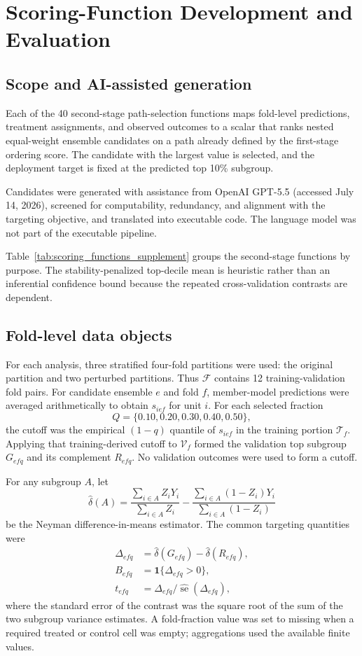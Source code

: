 \documentclass[12pt]{article}
\newcommand{\TargetFrac}{10{\%}\xspace}
\begin{document}
\section{Scoring-Function Development and Evaluation}
\label{supp:development_provenance}

\subsection{Scope and AI-assisted generation}

Each of the 40 second-stage path-selection functions maps fold-level predictions, treatment assignments, and observed outcomes to a scalar that ranks nested equal-weight ensemble candidates on a path already defined by the first-stage ordering score. The candidate with the largest value is selected, and the deployment target is fixed at the predicted top \TargetFrac{} subgroup.

Candidates were generated with assistance from OpenAI GPT-5.5 (accessed July 14, 2026), screened for computability, redundancy, and alignment with the targeting objective, and translated into executable code. The language model was not part of the executable pipeline.

Table~\ref{tab:scoring_functions_supplement} groups the second-stage functions by purpose. The stability-penalized top-decile mean is heuristic rather than an inferential confidence bound because the repeated cross-validation contrasts are dependent.

\subsection{Fold-level data objects}

For each analysis, three stratified four-fold partitions were used: the original partition and two perturbed partitions. Thus $\mathcal F$ contains 12 training-validation fold pairs. For candidate ensemble $e$ and fold $f$, member-model predictions were averaged arithmetically to obtain $s_{ief}$ for unit $i$. For each selected fraction
\[
Q=\{0.10,0.20,0.30,0.40,0.50\},
\]
the cutoff was the empirical $(1-q)$ quantile of $s_{ief}$ in the training portion $\mathcal T_f$. Applying that training-derived cutoff to $\mathcal V_f$ formed the validation top subgroup $G_{efq}$ and its complement $R_{efq}$. No validation outcomes were used to form a cutoff.

For any subgroup $A$, let
\[
\widehat{\delta}(A)
=
\frac{\sum_{i\in A}Z_iY_i}{\sum_{i\in A}Z_i}
-
\frac{\sum_{i\in A}(1-Z_i)Y_i}{\sum_{i\in A}(1-Z_i)}
\]
be the Neyman difference-in-means estimator. The common targeting quantities were
\begin{align}
\Delta_{efq}&=\widehat{\delta}(G_{efq})-\widehat{\delta}(R_{efq}),\\
B_{efq}&=\mathbf 1\{\Delta_{efq}>0\},\\
t_{efq}&=\Delta_{efq}/\widehat{\operatorname{se}}(\Delta_{efq}),
\end{align}
where the standard error of the contrast was the square root of the sum of the two subgroup variance estimates. A fold-fraction value was set to missing when a required treated or control cell was empty; aggregations used the available finite values.
\end{document}
